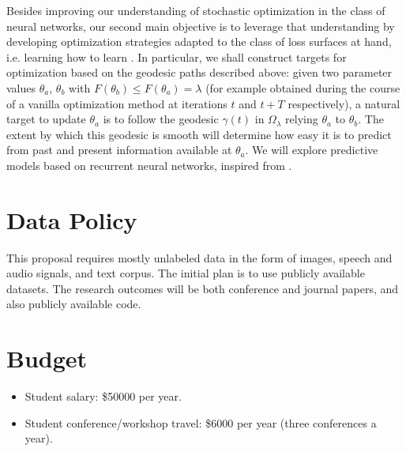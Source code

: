 \documentclass[10pt]{article}
\begin{document}
Besides improving our understanding of stochastic optimization in the class of neural networks, our second main objective is to leverage that understanding 
by developing optimization strategies adapted to the class of loss surfaces at hand, i.e. learning how to learn \cite{andrychowicz2016learning}. 
In particular, we shall construct targets for optimization based on the geodesic paths described above: given two parameter values 
$\theta_a$, $\theta_b$ with $F(\theta_b) \leq F(\theta_a)=\lambda$ (for example obtained during the course of a vanilla optimization method at iterations $t$ and $t+T$ respectively), a natural target to update $\theta_a$ is to follow the geodesic $\gamma(t)$ in $\Omega_\lambda$ relying $\theta_a$ to $\theta_b$. 
The extent by which this geodesic is smooth will determine how easy it is to predict from past and present information available at $\theta_a$. We will explore predictive models based on recurrent neural networks, inspired from \cite{andrychowicz2016learning}.

\section*{Data Policy}

This proposal requires mostly unlabeled data in the form of images, speech and audio signals,
and text corpus. The initial plan is to use publicly available datasets.
The research outcomes will be both conference and journal papers, and also publicly available code. 

\section*{Budget}

\begin{itemize}
\item Student salary: \$50000 per year.
\item Student conference/workshop travel: \$6000 per year (three conferences a year). 
\end{itemize}

{\small 


}
\end{document}
